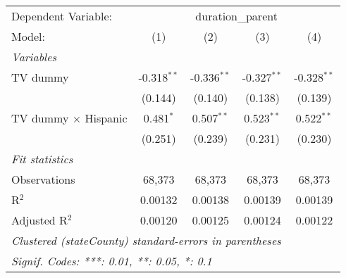\begin{tabular}{lcccc}
\tabularnewline\midrule\midrule
Dependent Variable:&\multicolumn{4}{c}{duration\_parent}\\
Model:&(1) & (2) & (3) & (4)\\
\midrule \emph{Variables}&   &   &   &  \\
TV dummy & -0.318$^{**}$ & -0.336$^{**}$ & -0.327$^{**}$ & -0.328$^{**}$\\
  &(0.144) & (0.140) & (0.138) & (0.139)\\
TV dummy $\times$ Hispanic & 0.481$^{*}$ & 0.507$^{**}$ & 0.523$^{**}$ & 0.522$^{**}$\\
  &(0.251) & (0.239) & (0.231) & (0.230)\\
\midrule \emph{Fit statistics}&  & & & \\
Observations & 68,373&68,373&68,373&68,373\\
R$^2$ & 0.00132&0.00138&0.00139&0.00139\\
Adjusted R$^2$ & 0.00120&0.00125&0.00124&0.00122\\
\midrule\midrule\multicolumn{5}{l}{\emph{Clustered (stateCounty) standard-errors in parentheses}}\\
\multicolumn{5}{l}{\emph{Signif. Codes: ***: 0.01, **: 0.05, *: 0.1}}\\
\end{tabular}


